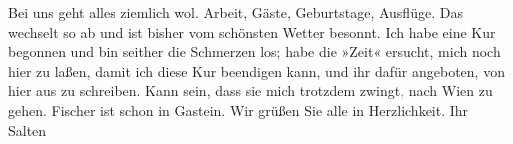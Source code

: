 \pstart
           Bei uns geht alles ziemlich
               wol. Arbeit, Gäste, Geburtstage, Ausflüge. Das wechselt so ab und ist bisher vom
               schönsten Wetter besonnt. Ich habe eine Kur begonnen und bin seither die Schmerzen
               los; habe die »Zeit« ersucht, mich noch hier zu laßen, damit ich diese
               Kur beendigen kann, und ihr dafür angeboten, von hier aus zu schreiben. Kann sein,
               dass sie mich trotzdem zwingt\textcolor{gray}{,} nach Wien zu gehen. Fischer ist schon in
                  Gastein. Wir grüßen Sie alle in
               Herzlichkeit.\pend
           \pstart Ihr \spacefill\mbox{Salten}\pend{}\endnumbering{}  \newcommand{\dateiname}{L03553}\newcommand{\titel}{Felix Salten an Arthur Schnitzler, 16. 8. 1911}\newcommand{\editorInnen}{Martin Anton Müller und Laura Untner}
